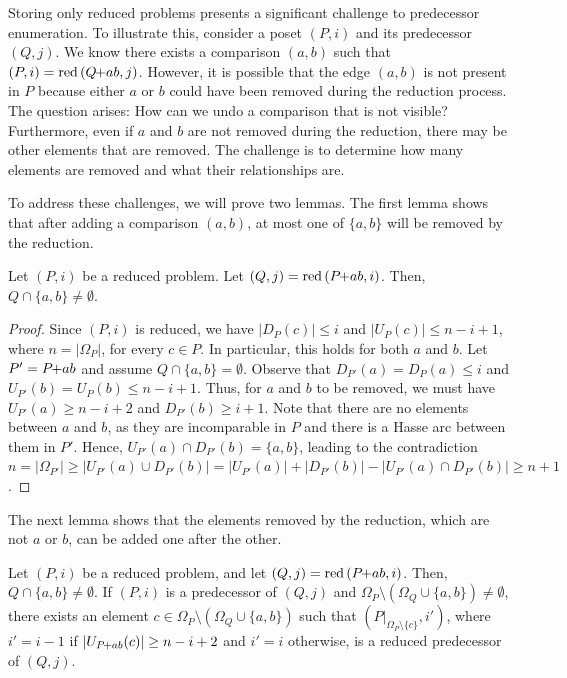 \documentclass[twoside,leqno,twocolumn]{article}
\newcommand{\pchild}[3]{{#1}\kern-1pt{+}{#2}{#3}}
\newcommand{\reduced}[1]{\operatorname{red}{#1}}
\newcommand{\less}[2]{D_{#1}(#2)}
\newcommand{\greater}[2]{U_{#1}(#2)}
\begin{document}
Storing only reduced problems presents a significant challenge to predecessor enumeration.
To illustrate this, consider a poset $(P, i)$ and its predecessor $(Q, j)$.
We know there exists a comparison $(a, b)$ such that $(P, i) = \reduced(\pchild{Q}{a}{b}, j)$.
However, it is possible that the edge $(a, b)$ is not present in $P$ because either $a$ or $b$ could have been removed during the reduction process.
The question arises: How can we undo a comparison that is not visible?
Furthermore, even if $a$ and $b$ are not removed during the reduction, there may be other elements that are removed.
The challenge is to determine how many elements are removed and what their relationships are.

To address these challenges, we will prove two lemmas.
The first lemma shows that after adding a comparison $(a, b)$, at most one of $\{a, b\}$ will be removed by the reduction.

\begin{lemma} \label{lemma:remove_only_last_element_edge}
  Let $(P, i)$ be a reduced problem.
  Let $(Q, j) = \reduced{(\pchild{P}{a}{b}, i)}$.
  Then, $Q \cap \{a, b\} \neq \emptyset$.
\end{lemma}

\begin{proof}
  Since $(P, i)$ is reduced, we have $|\less{P}{c}| \leq i$ and $|\greater{P}{c}| \leq n - i + 1$, where $n = |\Omega_P|$, for every $c \in P$.
  In particular, this holds for both $a$ and $b$.
  Let $P' = \pchild{P}{a}{b}$ and assume $Q \cap \{a, b\} = \emptyset$.
  Observe that $\less{P'}{a} = \less{P}{a} \leq i$ and $\greater{P'}{b} = \greater{P}{b} \leq n - i + 1$.
  Thus, for $a$ and $b$ to be removed, we must have $\greater{P'}{a} \geq n - i + 2$ and $\less{P'}{b} \geq i + 1$.
  Note that there are no elements between $a$ and $b$, as they are incomparable in $P$ and there is a Hasse arc between them in $P'$.
  Hence, $\greater{P'}{a} \cap \less{P'}{b} = \{a, b\}$, leading to the contradiction $n = |\Omega_{P'}| \ge |\greater{P'}{a} \cup \less{P'}{b}| = |\greater{P'}{a}| + |\less{P'}{b}| - |\greater{P'}{a} \cap \less{P'}{b}| \ge n + 1$.
\end{proof}

The next lemma shows that the elements removed by the reduction, which are not $a$ or $b$, can be added one after the other.

\begin{lemma} \label{lemma:remove_elements_iteratively}
  Let $(P, i)$ be a reduced problem, and let $(Q, j) = \reduced{(\pchild{P}{a}{b}, i)}$.
  Then, $Q \cap \{a, b\} \neq \emptyset$.
  If $(P, i)$ is a predecessor of $(Q, j)$ and $\Omega_P \setminus (\Omega_Q \cup \{a, b\}) \neq \emptyset$, there exists an element $c \in \Omega_P \setminus (\Omega_Q \cup \{a, b\})$ such that $(P|_{\Omega_P \setminus \{c\}}, i')$, where $i' = i - 1$ if $|\greater{\pchild{P}{a}{b}}{c}| \ge n - i + 2$ and $i' = i$ otherwise, is a reduced predecessor of $(Q, j)$.
\end{lemma}
\end{document}

